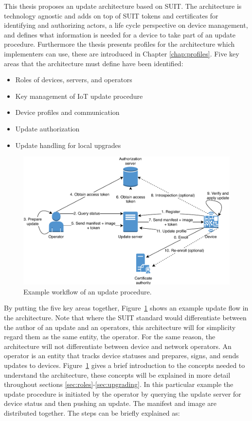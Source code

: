 \documentclass[0-thesis.tex]{subfiles}
\begin{document}
This thesis proposes an update architecture based on SUIT. The architecture is technology
agnostic and adds on top of SUIT tokens and certificates for identifying and authorizing
actors, a life cycle perspective on device management, and defines what information is
needed for a device to take part of an update procedure. Furthermore the thesis presents
profiles for the architecture which implementers can use, these are introduced in Chapter
\ref{chap:profiles}. Five key areas that the architecture must define have been
identified:

\begin{itemize}
    \item Roles of devices, servers, and operators
    \item Key management of IoT update procedure
    \item Device profiles and communication
    \item Update authorization
    \item Update handling for local upgrades
\end{itemize}

\begin{figure}
    \caption{Example workflow of an update procedure.}
    \label{fig:communication-workflow}
    \includegraphics{images/update-flow.pdf}
\end{figure}

By putting the five key areas together, Figure~\ref{fig:communication-workflow} shows an
example update flow in the architecture. Note that where the SUIT standard would
differentiate between the author of an update and an operators, this architecture will for
simplicity regard them as the same entity, the operator. For the same reason, the
architecture will not differentiate between device and network operators. An operator is
an entity that tracks device statuses and prepares, signs, and sends updates to devices.
Figure~\ref{fig:communication-workflow} gives a brief introduction to the concepts needed
to understand the architecture, these concepts will be explained in more detail throughout
sections \ref{sec:roles}-\ref{sec:upgrading}. In this particular example the update
procedure is initiated by the operator by querying the update server for device status and
then pushing an update. The manifest and image are distributed together. The steps can be
briefly explained as:
\end{document}
